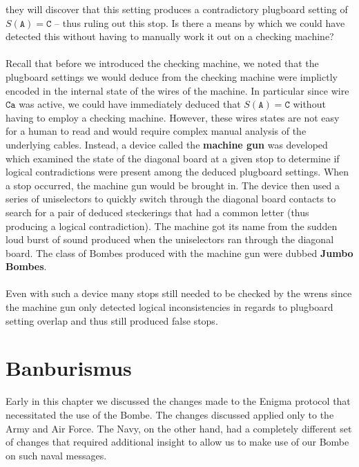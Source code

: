 they will discover that this setting produces a contradictory
plugboard setting of $S(\texttt{A}) = \texttt{C}$ -- thus ruling out
this stop. Is there a means by which we could have detected this
without having to manually work it out on a checking machine?
\\\\Recall that before we introduced the checking machine, we noted
that the plugboard settings we would deduce from the checking machine
were implictly encoded in the internal state of the wires of the
machine. In particular since wire $\texttt{Ca}$ was active, we could
have immediately deduced that $S(\texttt{A})= \texttt{C}$ without
having to employ a checking machine. However, these wires states are
not easy for a human to read and would require complex manual
analysis of the underlying cables. Instead, a device called the
	{\bf{machine gun}} was developed which examined the state of the
diagonal board at a given stop to determine if logical contradictions
were present among the deduced plugboard settings. When a stop
occurred, the machine gun would be brought in. The device then used a
series of uniselectors to quickly switch through the diagonal board
contacts to search for a pair of deduced steckerings that had a
common letter (thus producing a logical contradiction). The machine
got its name from the sudden loud burst of sound produced when the
uniselectors ran through the diagonal board. The class of Bombes produced with the machine gun were dubbed {\bf{Jumbo Bombes}}.
\\\\Even with such a device many stops still needed to be checked by
the wrens since the machine gun only detected logical inconsistencies
in regards to plugboard setting overlap and thus still produced false stops.

\section{Banburismus}
Early in this chapter we discussed the changes made to the Enigma
protocol that necessitated the use of the Bombe. The changes
discussed applied only to the Army and Air Force. The Navy, on the
other hand, had a completely different set of changes that required
additional insight to allow us to make use of our Bombe on such naval messages.

